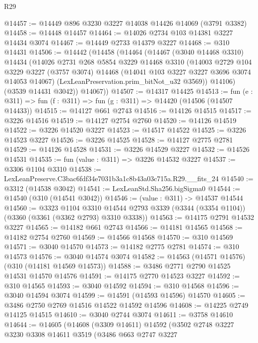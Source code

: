 \begin{lexlean}{R29}
\begin{coremodule}
@14457 := @14449 @896 @3230 @3227 @14038 @14426 @14069 (@3791 @3382)
@14458 := @14448 @14457
@14464 := @14026 @2734 @103 @14381 @3227 @14434 @3074
@14467 := @14449 @2733 @14379 @3227
@14468 := @310 @14431
@14506 := @14442
    (@14458
      (@14464
        (@14467
          (@3040 @14468 @3310)
          @14434
          (@14026
            @2731
            @268
            @5854
            @3229
            @14468
            @3310
            (@14003
              @2729
              @104
              @3229
              @3227
              (@3757 @3074)
              @14468
              (@14041 @103 @3227 @3227 @3696 @3074 @14053 @14067)
              (LexLeanPreservation.prim_bitNot_u32 @3569))
            @14106)
          (@3539 @14431 @3042))
        @14067))
@14507 := @14317 @14425
@14513 := fun (e : @311) => fun (f : @311) => fun (g : @311) => @14420 (@14506 (@14507 @14433))
@14515 := @14127 @661 @2743
@14516 := @14126 @14515
@14517 := @3226 @14516
@14519 := @14127 @2754 @2760
@14520 := @14126 @14519
@14522 := @3226 @14520 @3227
@14523 := @14517 @14522
@14525 := @3226 @14523 @3227
@14526 := @3226 @14525
@14528 := @14127 @2775 @2781
@14529 := @14126 @14528
@14531 := @3226 @14529 @3227
@14532 := @14526 @14531
@14535 := fun (value : @311) => @3226 @14532 @3227
@14537 := @3306 @1104 @3310
@14538 := LexLeanPreserve.C3bac6fdf34e7031b3a1c8b43a03c715a.R29.__fits_24
@14540 := @3312 (@14538 @3042)
@14541 := LexLeanStd.Sha256.bigSigma0
@14544 := @14540 (@310 (@14541 @3042))
@14546 := (value : @311) -> @14537 @14544
@14560 := @3323
    @1104
    @3310
    @14544
    @2793
    @3339
    (@3344 (@3354 @1104))
    (@3360 (@3361 (@3362 @2793) @3310 @3338))
@14563 := @14175 @2791 @14532 @3227
@14565 := @14182 @661 @2743
@14566 := @14181 @14565
@14568 := @14182 @2754 @2760
@14569 := @14566 @14568
@14570 := @310 @14569
@14571 := @3040 @14570
@14573 := @14182 @2775 @2781
@14574 := @310 @14573
@14576 := @3040 @14574 @3074
@14582 := @14563 (@14571 @14576) (@310 (@14181 @14569 @14573))
@14588 := @3486 @2771 @2790 @14525 @14531 @14570 @14576
@14591 := @14175 @2770 @14523 @3227
@14592 := @310 @14565
@14593 := @3040 @14592
@14594 := @310 @14568
@14596 := @3040 @14594 @3074
@14599 := @14591 (@14593 @14596) @14570
@14605 := @3486 @2750 @2769 @14516 @14522 @14592 @14596
@14608 := @14225 @2749 @14125 @14515
@14610 := @3040 @2744 @3074
@14611 := @3758 @14610
@14644 := @14605
    (@14608
      (@3309 @14611)
      @14592
      (@3502
        @2748
        @3227
        @3230
        @3308
        @14611
        @3519
        (@3486
          @663
          @2747
          @3227

\end{coremodule}
\end{lexlean}
